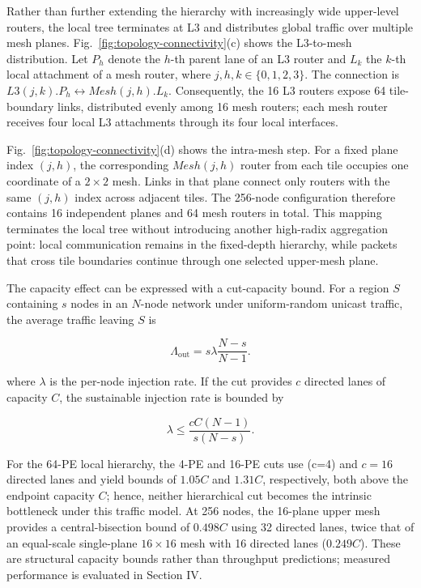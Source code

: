 \documentclass[conference]{IEEEtran}
\begin{document}
Rather than further extending the hierarchy with increasingly wide
upper-level routers, the local tree terminates at L3 and distributes
global traffic over multiple mesh planes. Fig.~\ref{fig:topology-connectivity}(c)
shows the L3-to-mesh distribution. Let \(P_h\) denote the \(h\)-th parent
lane of an L3 router and \(L_k\) the \(k\)-th local attachment of a mesh router,
where \(j,h,k\in\{0,1,2,3\}\). The connection is
\(L3(j,k).P_h \leftrightarrow Mesh(j,h).L_k\). Consequently, the 16 L3
routers expose 64 tile-boundary links, distributed evenly among 16 mesh
routers; each mesh router receives four local L3 attachments through its
four local interfaces.

Fig.~\ref{fig:topology-connectivity}(d) shows the intra-mesh step.
For a fixed plane index \((j,h)\), the corresponding \(Mesh(j,h)\) router
from each tile occupies one coordinate of a \(2\times2\) mesh. Links in
that plane connect only routers with the same \((j,h)\) index across
adjacent tiles. The 256-node configuration therefore contains 16
independent planes and 64 mesh routers in total. This mapping terminates
the local tree without introducing another high-radix aggregation point:
local communication remains in the fixed-depth hierarchy, while packets
that cross tile boundaries continue through one selected upper-mesh
plane.

The capacity effect can be expressed with a cut-capacity bound.
For a region \(S\) containing \(s\) nodes in an \(N\)-node network under
uniform-random unicast traffic, the average traffic leaving \(S\) is

\begin{equation}\label{eq:cut-traffic} \Lambda_{\mathrm{out}} = s\lambda\frac{N-s}{N-1}. \end{equation}

where \(\lambda\) is the per-node injection rate. If the cut provides
\(c\) directed lanes of capacity \(C\), the sustainable injection rate is
bounded by

\begin{equation}\label{eq:cut-bound} \lambda \leq \frac{cC(N-1)}{s(N-s)}. \end{equation}

For the 64-PE local hierarchy, the 4-PE and 16-PE cuts use (c=4) and
\(c=16\) directed lanes and yield bounds of \(1.05C\) and \(1.31C\),
respectively, both above the endpoint capacity \(C\); hence, neither
hierarchical cut becomes the intrinsic bottleneck under this traffic
model. At 256 nodes, the 16-plane upper mesh provides a central-bisection
bound of \(0.498C\) using 32 directed lanes, twice that of an equal-scale
single-plane \(16 \times 16\) mesh with 16 directed lanes (\(0.249C\)).
These are structural capacity bounds rather than throughput predictions;
measured performance is evaluated in Section IV.
\end{document}
